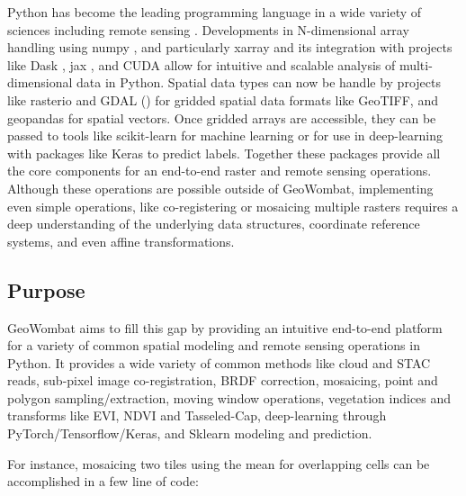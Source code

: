 \documentclass{jors}
\begin{document}
Python has become the leading programming language in a wide variety of sciences including remote sensing \cite{srinath2017python}. Developments in N-dimensional array handling using numpy \cite{harris2020array}, and particularly xarray \cite{xarray} and its integration with projects like Dask \cite{dask}, jax \cite{jax2018github}, and CUDA \cite{cuda} allow for intuitive and scalable analysis of multi-dimensional data in Python. Spatial data types can now be handle by projects like rasterio \cite{rasterio} and GDAL (\cite{GDAL}) for gridded spatial data formats like GeoTIFF, and geopandas \cite{geopandas} for spatial vectors. Once gridded arrays are accessible, they can be passed to tools like scikit-learn \cite{scikit-learn} for machine learning or for use in deep-learning with packages like Keras \cite{keras,pytorch,tensorflow} to predict labels. Together these packages provide all the core components for an end-to-end raster and remote sensing operations. Although these operations are possible outside of GeoWombat, implementing even simple operations, like co-registering or mosaicing multiple rasters requires a deep understanding of the underlying data structures, coordinate reference systems, and even affine transformations.  


\subsection*{Purpose} 

GeoWombat aims to fill this gap by providing an intuitive end-to-end platform for a variety of common spatial modeling and remote sensing operations in Python. It provides a wide variety of common methods like cloud and STAC reads, sub-pixel image co-registration, BRDF correction, mosaicing, point and polygon sampling/extraction, moving window operations, vegetation indices and transforms like EVI, NDVI and Tasseled-Cap, deep-learning through PyTorch/Tensorflow/Keras, and Sklearn modeling and prediction.
\newline

For instance, mosaicing two tiles using the mean for overlapping cells can be accomplished in a few line of code:
\end{document}
